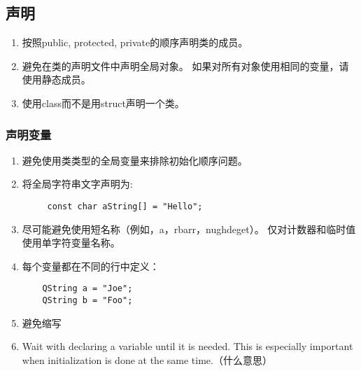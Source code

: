\subsection{声明}
\begin{enumerate}
	\item 按照public, protected, private的顺序声明类的成员。
	\item 避免在类的声明文件中声明全局对象。 如果对所有对象使用相同的变量，请使用静态成员。
	\item 使用class而不是用struct声明一个类。
\end{enumerate}

\subsubsection{声明变量}
\begin{enumerate}
	\item 避免使用类类型的全局变量来排除初始化顺序问题。
	\item 将全局字符串文字声明为:
	\begin{lstlisting}
	 const char aString[] = "Hello";
	\end{lstlisting}
	\item 尽可能避免使用短名称（例如，a，rbarr，nughdeget）。 仅对计数器和临时值使用单字符变量名称。
	\item 每个变量都在不同的行中定义：
	\begin{lstlisting}
    QString a = "Joe";
	QString b = "Foo";
	\end{lstlisting}
	
	\item 避免缩写
	\item Wait with declaring a variable until it is needed. This is especially important when initialization is done at the same time.（什么意思）
\end{enumerate}

